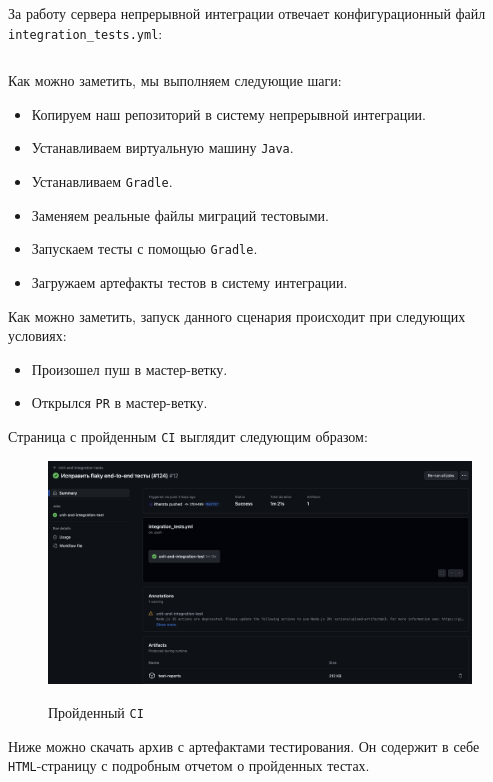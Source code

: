 \documentclass[a4paper, 14pt]{article}
\begin{document}
За работу сервера непрерывной интеграции отвечает конфигурационный файл \texttt{integration\_tests.yml}:
\small
\inputminted[frame=single]{yaml}{./code/1.yml}
\large

Как можно заметить, мы выполняем следующие шаги:

\begin{itemize}
    \item Копируем наш репозиторий в систему непрерывной интеграции.
    \item Устанавливаем виртуальную машину \texttt{Java}.
    \item Устанавливаем \texttt{Gradle}.
    \item Заменяем реальные файлы миграций тестовыми.
    \item Запускаем тесты с помощью \texttt{Gradle}.
    \item Загружаем артефакты тестов в систему интеграции.
\end{itemize}

Как можно заметить, запуск данного сценария происходит при следующих условиях:

\begin{itemize}
    \item Произошел пуш в мастер-ветку.
    \item Открылся \texttt{PR} в мастер-ветку.
\end{itemize}

Страница с пройденным \texttt{CI} выглядит следующим образом:

\begin{figure}[H]
    \centering
    \includegraphics[width=17cm]{resources/2.png}\\
    \caption{Пройденный \texttt{CI}}
\end{figure}

Ниже можно скачать архив с артефактами тестирования. Он содержит в себе \texttt{HTML}-страницу с подробным отчетом о пройденных тестах.
\end{document}

